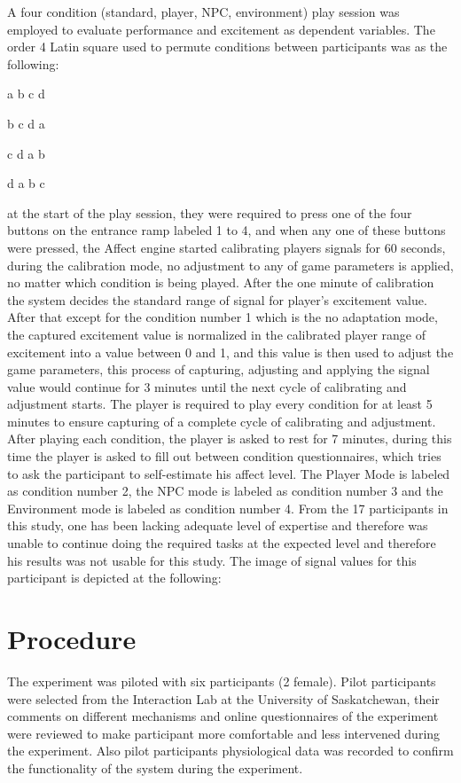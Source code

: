 A four condition (standard, player, NPC, environment) play session was employed to evaluate performance and excitement as dependent variables. The order 4 Latin square used to permute conditions between participants was as the following:

\centerline{a b c d}
\centerline{b c d a}
\centerline{c d a b}
\centerline{d a b c}

at the start of the play session, they were required to press one of the four buttons on the entrance ramp labeled 1 to 4, and when any one of these buttons were pressed, the Affect engine started calibrating players signals for 60 seconds, during the calibration mode, no adjustment to any of game parameters is applied, no matter which condition is being played. After the one minute of calibration the system decides the standard range of signal for player's excitement value. After that except for the condition number 1 which is the no adaptation mode, the captured excitement value is normalized in the calibrated player range of excitement into a value between 0 and 1, and this value is then used to adjust the game parameters, this process of capturing, adjusting and applying the signal value would continue for 3 minutes until the next cycle of calibrating and adjustment starts. The player is required to play every condition for at least 5 minutes to ensure capturing of a complete cycle of calibrating and adjustment. After playing each condition, the player is asked to rest for 7 minutes, during this time the player is asked to fill out between condition questionnaires, which tries to ask the participant to self-estimate his affect level. The Player Mode is labeled as condition number 2, the NPC mode is labeled as condition number 3 and the Environment mode is labeled as condition number 4. From the 17 participants in this study, one has been lacking adequate level of expertise and therefore was unable to continue doing the required tasks at the expected level and therefore his results was not usable for this study. The image of signal values for this participant is depicted at the following:

\section{Procedure}

The experiment was piloted with six participants (2 female). Pilot participants were selected from the Interaction Lab at the University of Saskatchewan, their comments on different mechanisms and online questionnaires of the experiment were reviewed to make participant more comfortable and less intervened during the experiment. Also pilot participants physiological data was recorded to confirm the functionality of the system during the experiment.

